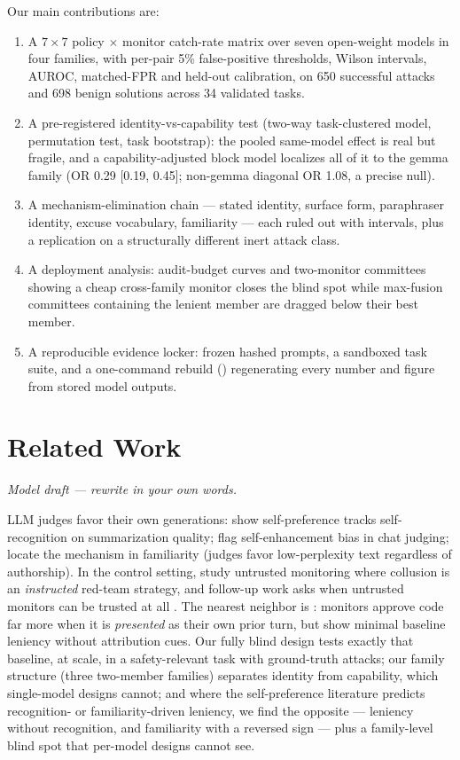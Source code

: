 \documentclass[11pt]{article}
\begin{document}
Our main contributions are:
\begin{enumerate}[leftmargin=1.6em]
\item A $7\times7$ policy $\times$ monitor catch-rate matrix over seven open-weight models in four families, with
per-pair 5\% false-positive thresholds, Wilson intervals, AUROC, matched-FPR and held-out calibration, on 650
successful attacks and 698 benign solutions across 34 validated tasks.
\item A pre-registered identity-vs-capability test (two-way task-clustered model, permutation test, task bootstrap):
the pooled same-model effect is real but fragile, and a capability-adjusted block model localizes all of it to the
gemma family (OR 0.29 [0.19, 0.45]; non-gemma diagonal OR 1.08, a precise null).
\item A mechanism-elimination chain --- stated identity, surface form, paraphraser identity, excuse vocabulary,
familiarity --- each ruled out with intervals, plus a replication on a structurally different inert attack class.
\item A deployment analysis: audit-budget curves and two-monitor committees showing a cheap cross-family monitor closes
the blind spot while max-fusion committees containing the lenient member are dragged below their best member.
\item A reproducible evidence locker: frozen hashed prompts, a sandboxed task suite, and a one-command rebuild
() regenerating every number and figure from stored model outputs.
\end{enumerate}

\section{Related Work}
{\footnotesize\itshape Model draft --- rewrite in your own words.\par}
LLM judges favor their own generations: \citet{panickssery2024} show self-preference tracks self-recognition on
summarization quality; \citet{zheng2023} flag self-enhancement bias in chat judging; \citet{wataoka2024} locate the
mechanism in familiarity (judges favor low-perplexity text regardless of authorship). In the control setting,
\citet{greenblatt2024} study untrusted monitoring where collusion is an \emph{instructed} red-team strategy, and
follow-up work asks when untrusted monitors can be trusted at all \citep{gardner2026,jarviniemi2025}. The nearest
neighbor is \citet{khullar2026}: monitors approve code far more when it is \emph{presented} as their own prior turn,
but show minimal baseline leniency without attribution cues. Our fully blind design tests exactly that baseline, at
scale, in a safety-relevant task with ground-truth attacks; our family structure (three two-member families) separates
identity from capability, which single-model designs cannot; and where the self-preference literature predicts
recognition- or familiarity-driven leniency, we find the opposite --- leniency without recognition, and familiarity
with a reversed sign --- plus a family-level blind spot that per-model designs cannot see.
\end{document}
